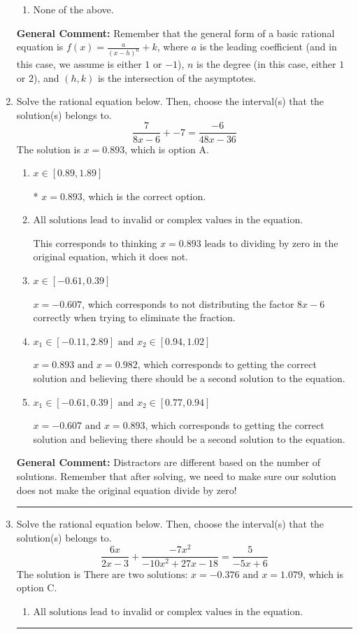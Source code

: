 \documentclass{extbook}[14pt]
\newcommand{\litem}[1]{\item #1

\rule{\textwidth}{0.4pt}}
\begin{document}
\begin{enumerate}
{\begin{enumerate}[label=\Alph*.]
\begin{multicols}{2}
\end{multicols}\item None of the above.\end{enumerate}
\textbf{General Comment:} Remember that the general form of a basic rational equation is $ f(x) = \frac{a}{(x-h)^n} + k$, where $a$ is the leading coefficient (and in this case, we assume is either $1$ or $-1$), $n$ is the degree (in this case, either $1$ or $2$), and $(h, k)$ is the intersection of the asymptotes.
}
\litem{
Solve the rational equation below. Then, choose the interval(s) that the solution(s) belongs to.
\[ \frac{7}{8x -6} + -7 = \frac{-6}{48x -36} \]The solution is \( x = 0.893 \), which is option A.\begin{enumerate}[label=\Alph*.]
\item \( x \in [0.89,1.89] \)

* $x = 0.893$, which is the correct option.
\item \( \text{All solutions lead to invalid or complex values in the equation.} \)

This corresponds to thinking $x = 0.893$ leads to dividing by zero in the original equation, which it does not.
\item \( x \in [-0.61,0.39] \)

$x = -0.607$, which corresponds to not distributing the factor $8x -6$ correctly when trying to eliminate the fraction.
\item \( x_1 \in [-0.11, 2.89] \text{ and } x_2 \in [0.94,1.02] \)

$x = 0.893 \text{ and } x = 0.982$, which corresponds to getting the correct solution and believing there should be a second solution to the equation.
\item \( x_1 \in [-0.61, 0.39] \text{ and } x_2 \in [0.77,0.94] \)

$x = -0.607 \text{ and } x = 0.893$, which corresponds to getting the correct solution and believing there should be a second solution to the equation.
\end{enumerate}

\textbf{General Comment:} Distractors are different based on the number of solutions. Remember that after solving, we need to make sure our solution does not make the original equation divide by zero!
}
\litem{
Solve the rational equation below. Then, choose the interval(s) that the solution(s) belongs to.
\[ \frac{6x}{2x -3} + \frac{-7x^{2}}{-10x^{2} +27 x -18} = \frac{5}{-5x + 6} \]The solution is \( \text{There are two solutions: } x = -0.376 \text{ and } x = 1.079 \), which is option C.\begin{enumerate}[label=\Alph*.]
\item \( \text{All solutions lead to invalid or complex values in the equation.} \)



\end{enumerate}}
\end{enumerate}
\end{document}
